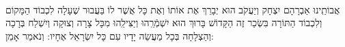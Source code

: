 \documentclass[twoside, openany, parskip=half, 11pt]{book}
\begin{document}
\gadlu

\avharachamim

\vesigale


\torahbarachu 

\hagomel

\vspace{-\baselineskip}

\\
 אֲבוֹתֵֽינוּ אַבְרָהָם יִצְחָק וְיַעֲקֹב הוּא יְבָרֵךְ אֶת 
 אוֹתוֹ וְאֶת כָּל אֲשֶׁר לוֹ 
בַּעֲבוּר שֶׁעָלָה לִכְבוֹד הַמָּקוֹם וְלִכְבוֹד הַתּוֹרָה 
 בִּשְׂכַר זֶה הַקָּדוֹשׁ בָּרוּךְ הוּא יִשְׁמְֿרֵֽהוּ וְיַצִּילֵֽהוּ מִכָּל צָרָה וְצוּקָה 
וְיִשְׁלַח בְּרָכָה וְהַצְלָחָה בְּכָל מַעֲשֵׂה יָדָיו עִם כָּל יִשְׂרָאֵל אֶחָיו: וְנֹאמַר אָמֵן:
\end{document}
